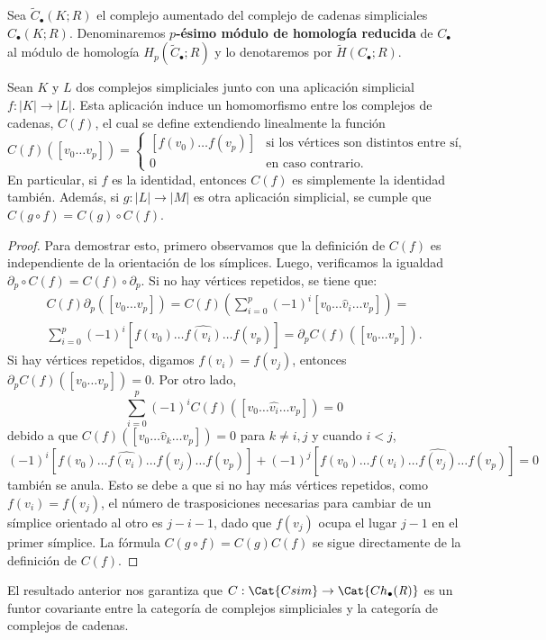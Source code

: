 \begin{definicion}
	Sea \(\widetilde{C}_{\bullet}(K;R)\) el complejo aumentado del complejo de cadenas
	simpliciales \(C_{\bullet}(K;R)\). Denominaremos \textbf{\(p\)-ésimo módulo de
	homología reducida} de \(C_{\bullet}\) al módulo de homología \(H_{p}(\widetilde{C}
	_{\bullet};R)\) y lo denotaremos por \(\widetilde{H}(C_{\bullet};R)\).
\end{definicion}

\begin{proposicion}
	\label{prop:simpl_app_hom} Sean \(K\) y \(L\) dos complejos simpliciales junto con
	una aplicación simplicial \(f: |K| \to |L|\). Esta aplicación induce un
	homomorfismo entre los complejos de cadenas, \(C(f)\), el cual se define
	extendiendo linealmente la función
	\[
		C(f)([v_{0} \ldots v_{p}]) =
		\begin{cases}
			[f(v_{0}) \ldots f(v_{p})] & \text{si los vértices son distintos entre sí}, \\
			0                         & \text{en caso contrario}.
		\end{cases}
	\]
	En particular, si \(f\) es la identidad, entonces \(C(f)\) es simplemente la
	identidad también. Además, si \(g: |L| \longrightarrow |M|\) es otra aplicación
	simplicial, se cumple que \(C(g \circ f) = C(g) \circ C(f)\).
\end{proposicion}
\begin{proof}
	Para demostrar esto, primero observamos que la definición de \(C(f)\) es
	independiente de la orientación de los símplices. Luego, verificamos la
	igualdad \(\partial_{p} \circ C(f) = C(f) \circ \partial_{p}\). Si no hay vértices
	repetidos, se tiene que:
	\begin{gather*}
		C(f) \partial_{p}([v_{0} \ldots v_{p}]) = C(f) \left( \sum_{i=0}^{p} (-1)^{i}
		[v_{0} \ldots \hat{v}_{i} \ldots v_{p}] \right) = \\ \sum_{i=0}^{p} (-1)^{i}
		[f(v_{0}) \ldots \widehat{f(v_i)}\ldots f(v_{p})] = \partial_{p} C(f)([v_{0}
		\ldots v_{p}]).
	\end{gather*}
	Si hay vértices repetidos, digamos \(f(v_{i}) = f(v_{j})\), entonces \(\partial_{p}
	C(f)([v_{0} \ldots v_{p}]) = 0\). Por otro lado,
	\[
		\sum_{i=0}^{p} (-1)^{i} C(f)([v_{0} \ldots \hat{v_i}\ldots v_{p}]) = 0
	\]
	debido a que \(C(f)([v_{0} \ldots \hat{v}_{k} \ldots v_{p}]) = 0\) para \(k \neq i,j\)
	y cuando \(i < j\),
	\[
		(-1)^{i} [f(v_{0}) \ldots \widehat{f(v_i)}\ldots f(v_{j}) \ldots f(v_{p})] +
		(-1)^{j} [f(v_{0}) \ldots f(v_{i}) \ldots \widehat{f(v_j)}\ldots f(v_{p})] =
		0
	\]
	también se anula. Esto se debe a que si no hay más vértices repetidos, como
	\(f(v_{i}) = f(v_{j})\), el número de trasposiciones necesarias para cambiar de un
	símplice orientado al otro es \(j-i-1\), dado que \(f(v_{j})\) ocupa el lugar
	\(j-1\) en el primer símplice. La fórmula \(C(g \circ f)=C(g)C(f)\) se sigue directamente
	de la definición de \(C(f)\).
\end{proof}
\begin{observacion}
	El resultado anterior nos garantiza que $C: \Cat{Csim} \to \Cat{Ch_\bullet(\mathit{R})}$ es un funtor covariante entre la categoría de complejos simpliciales y la categoría de complejos de cadenas.
\end{observacion}

